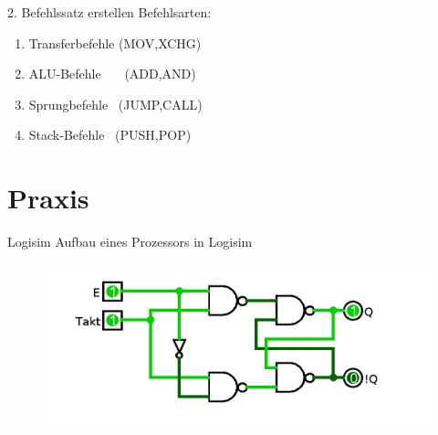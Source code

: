 \documentclass{beamer}
\begin{document}
\begin{frame}[t]{2. Befehlssatz erstellen}\pause
Befehlsarten:
\bigskip
\center
\begin{enumerate}
\item{Transferbefehle  (MOV,XCHG)}
\item{ALU-Befehle \ \ \ (ADD,AND)}
\item{Sprungbefehle  \  (JUMP,CALL)}
\item{Stack-Befehle \ (PUSH,POP)}
\end{enumerate}
\end{frame}

\section{Praxis}
\begin{frame}{Logisim}
Aufbau eines Prozessors in Logisim
\begin{figure}[!htb]
\centering
\includegraphics[scale=0.30]{flipflop}
\end{figure}
\end{frame}
\end{document}
